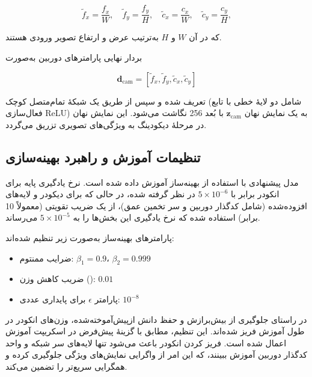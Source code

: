 \begin{equation}
\tilde{f}_x = \frac{f_x}{W}, \quad
\tilde{f}_y = \frac{f_y}{H}, \quad
\tilde{c}_x = \frac{c_x}{W}, \quad
\tilde{c}_y = \frac{c_y}{H},
\end{equation}

که در آن $W$ و $H$ به‌ترتیب عرض و ارتفاع تصویر ورودی هستند.

بردار نهایی پارامترهای دوربین به‌صورت

\begin{equation}
\mathbf{d}_{\mathrm{cam}} = [\tilde{f}_x, \tilde{f}_y, \tilde{c}_x, \tilde{c}_y]
\end{equation}

تعریف شده و سپس از طریق یک شبکهٔ تمام‌متصل کوچک (شامل دو لایهٔ خطی با تابع فعال‌سازی ReLU) به یک نمایش نهان $\mathbf{z}_{\mathrm{cam}}$ با بُعد 256 نگاشت می‌شود. این نمایش نهان در مرحلهٔ دیکودینگ به ویژگی‌های تصویری تزریق می‌گردد.

\subsection{تنظیمات آموزش و راهبرد بهینه‌سازی}

مدل پیشنهادی با استفاده از بهینه‌ساز  \cite{Loshchilov2019AdamW} آموزش داده شده است. نرخ یادگیری پایه برای انکودر  برابر با $5 \times 10^{-6}$ در نظر گرفته شده، در حالی که برای دیکودر و لایه‌های افزوده‌شده (شامل کدگذار دوربین و سر تخمین عمق)، از یک ضریب تقویتی (معمولاً 10 برابر) استفاده شده که نرخ یادگیری این بخش‌ها را به $5 \times 10^{-5}$ می‌رساند.

پارامترهای بهینه‌ساز به‌صورت زیر تنظیم شده‌اند:

\begin{itemize}
    \item ضرایب ممنتوم: $\beta_1 = 0.9$، $\beta_2 = 0.999$
    \item ضریب کاهش وزن (): $0.01$
    \item پارامتر $\epsilon$ برای پایداری عددی: $10^{-8}$
\end{itemize}

در راستای جلوگیری از بیش‌برازش و حفظ دانش ازپیش‌آموخته‌شده، وزن‌های انکودر  در طول آموزش فریز شده‌اند. این تنظیم، مطابق با گزینهٔ پیش‌فرض  در اسکریپت آموزش اعمال شده است. فریز کردن انکودر باعث می‌شود تنها لایه‌های سر شبکه و واحد کدگذار دوربین آموزش ببینند، که این امر از واگرایی نمایش‌های ویژگی جلوگیری کرده و همگرایی سریع‌تر را تضمین می‌کند.

